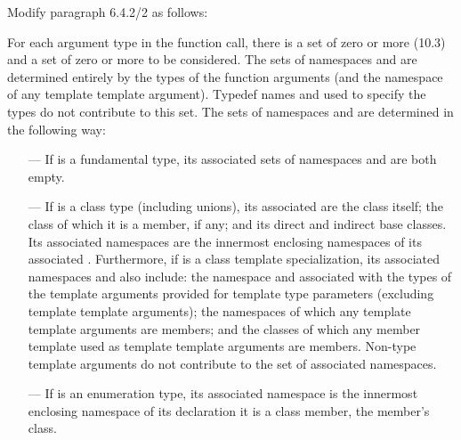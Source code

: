 \noindent
Modify paragraph 6.4.2/2 as follows:
\begin{std.txt}
  \resetalinea[1]
  \alinea
  For each argument type  in the function call, there is a
  set of zero or more  (10.3) and a set of
  zero or more 
   to be considered.  The sets of
  namespaces and   are determined
  entirely by the types of the function arguments (and the namespace
  of any template template argument).  Typedef names and
   used to specify the types do not
  contribute to this set.  The sets of namespaces
  and   are determined in the
  following way:
  \begin{itemize}
  \item[---] If  is a fundamental type, its associated sets
  of namespaces and   are both empty.

  \item[---] If  is a class type (including unions), its
  associated   are the class itself;
  the class of which it is a member, if any; and its direct and
  indirect base classes.  Its associated namespaces are the innermost
  enclosing namespaces of its associated  .
  Furthermore, if  is a class template specialization, its
  associated namespaces and   also
  include: the namespace and  
  associated with the types of the template arguments provided for
  template type parameters (excluding template template arguments);
   the
  namespaces of which any template template arguments are members;
  and the classes of which any member template used as template
  template arguments are members. \enternote Non-type template
  arguments do not contribute to the set of associated namespaces. \exitnote

  \item[---] If  is an enumeration type, its associated
  namespace is the innermost enclosing namespace of its
  declaration it is a class member,  the member's class.


\end{itemize}
\end{std.txt}
